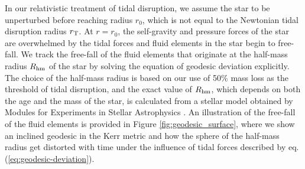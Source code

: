 \documentclass[useAMS,usenatbib]{mn2e}
\def\Rhm{R_{\rm hm}}
\begin{document}

In our relativistic treatment of tidal disruption, we assume the star to be unperturbed before reaching radius $r_0$, which is not equal to the Newtonian tidal disruption radius $r_{\rm T}$.
At $r=r_0$, the self-gravity and pressure forces of the star are overwhelmed by the tidal forces and fluid elements in the star begin to free-fall. We track the free-fall of the fluid elements that originate at the half-mass radius $\Rhm$ of the star by solving the equation of geodesic deviation explicitly. The choice of the half-mass radius is based on our use of 50\% mass loss as the threshold of tidal disruption, and the exact value of $\Rhm$, which depends on both the age and the mass of the star, is calculated from a stellar model obtained by Modules for Experiments in Stellar Astrophysics \citep[MESA,][]{Paxton2011, Paxton2013, Paxton2015, Paxton2018, Paxton2019}.
An illustration of the free-fall of the fluid elements is provided in Figure \ref{fig:geodesic_surface}, where we show an inclined geodesic in the Kerr metric and how the sphere of the half-mass radius get distorted with time under the influence of tidal forces described by eq. (\ref{eq:geodesic-deviation}).
\end{document}
